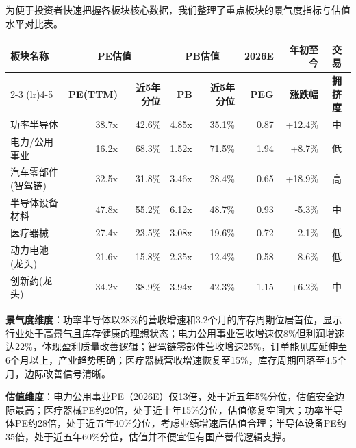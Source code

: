 为便于投资者快速把握各板块核心数据，我们整理了重点板块的景气度指标与估值水平对比表。

\begin{exhibitbox}[图表1-4：七大重点板块估值对比表（截至2026年6月22日）]
\scriptsize
\setlength{\tabcolsep}{3pt}
\centering
\vspace{0.3cm}
\begin{tabularx}{\textwidth}{@{}X r r r r r r c @{}}
\toprule
\textbf{板块名称} & \multicolumn{2}{c}{\textbf{PE估值}} & \multicolumn{2}{c}{\textbf{PB估值}} & \textbf{2026E} & \textbf{年初至今} & \textbf{交易} \\
\cmidrule(lr){2-3} \cmidrule(lr){4-5}
& \textbf{PE(TTM)} & \textbf{近5年分位} & \textbf{PB} & \textbf{近5年分位} & \textbf{PEG} & \textbf{涨跌幅} & \textbf{拥挤度} \\
\midrule
功率半导体 & 38.7x & 42.6\% & 4.85x & 35.1\% & 0.87 & +12.4\% & 中 \\
电力/公用事业 & 16.2x & 68.3\% & 1.52x & 71.5\% & 1.94 & +8.7\% & 低 \\
汽车零部件(智驾链) & 32.5x & 31.8\% & 3.46x & 28.4\% & 0.65 & +18.9\% & 高 \\
半导体设备材料 & 47.8x & 55.2\% & 6.12x & 48.7\% & 0.93 & -5.3\% & 中 \\
医疗器械 & 27.4x & 23.5\% & 3.08x & 19.6\% & 0.72 & -2.1\% & 低 \\
动力电池(龙头) & 21.6x & 15.8\% & 2.35x & 12.4\% & 0.58 & -8.6\% & 低 \\
创新药(龙头) & 34.2x & 38.9\% & 3.94x & 42.3\% & 1.15 & +6.2\% & 中 \\
\bottomrule
\end{tabularx}
\vspace{0.2cm}
\end{exhibitbox}

\textbf{景气度维度}：功率半导体以28\%的营收增速和3.2个月的库存周期位居首位，显示行业处于高景气且库存健康的理想状态；电力公用事业营收增速仅8\%但利润增速达22\%，体现盈利质量改善逻辑；智驾链零部件营收增速25\%，订单能见度延伸至6个月以上，产业趋势明确；医疗器械营收增速恢复至15\%，库存周期回落至4.5个月，边际改善信号清晰。

\textbf{估值维度}：电力公用事业PE（2026E）仅13倍，处于近五年5\%分位，估值安全边际最高；医疗器械PE约20倍，处于近十年15\%分位，估值修复空间大；功率半导体PE约28倍，处于近五年40\%分位，考虑业绩增速后估值合理；半导体设备PE约35倍，处于近五年60\%分位，估值并不便宜但有国产替代逻辑支撑。

